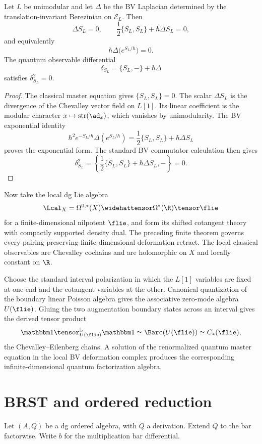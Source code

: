 \begin{theorem}
Let $L$ be unimodular and let $\Delta$ be the BV Laplacian determined by the translation-invariant Berezinian on $\mathcal E_L$. Then
\[
 \Delta S_L=0,
 \qquad
 \frac12\{S_L,S_L\}+\hbar\Delta S_L=0,
\]
and equivalently
\[
 \hbar\Delta\bigl(e^{S_L/\hbar}\bigr)=0.
\]
The quantum observable differential
\[
 \delta_{S_L}=\{S_L,-\}+\hbar\Delta
\]
satisfies $\delta_{S_L}^2=0$.
\end{theorem}
\begin{proof}
The classical master equation gives $\{S_L,S_L\}=0$. The scalar $\Delta S_L$ is the divergence of the Chevalley vector field on $L[1]$. Its linear coefficient is the modular character $x\mapsto\operatorname{str}(\ad_x)$, which vanishes by unimodularity. The BV exponential identity
\[
 \hbar^2e^{-S_L/\hbar}\Delta(e^{S_L/\hbar})
 =\frac12\{S_L,S_L\}+\hbar\Delta S_L
\]
proves the exponential form. The standard BV commutator calculation then gives
\[
 \delta_{S_L}^2=\left\{\frac12\{S_L,S_L\}+\hbar\Delta S_L,-\right\}=0.
\]
\end{proof}

Now take the local dg Lie algebra
\[
 \Lcal_X=\Omega^{0,*}(X)\widehattensor\Omega^*(\R)\tensor\flie
\]
for a finite-dimensional nilpotent $\flie$, and form its shifted cotangent theory with compactly supported density dual. The preceding finite theorem governs every pairing-preserving finite-dimensional deformation retract. The local classical observables are Chevalley cochains and are holomorphic on $X$ and locally constant on $\R$.

Choose the standard interval polarization in which the $L[1]$ variables are fixed at one end and the cotangent variables at the other. Canonical quantization of the boundary linear Poisson algebra gives the associative zero-mode algebra $U(\flie)$. Gluing the two augmentation boundary states across an interval gives the derived tensor product
\[
 \mathbbm1\tensor_{U(\flie)}^{\mathbb L}\mathbbm1
 \simeq\Barc(U(\flie))
 \simeq C_*(\flie),
\]
the Chevalley--Eilenberg chains. A solution of the renormalized quantum master equation in the local BV deformation complex produces the corresponding infinite-dimensional quantum factorization algebra.

\chapter{BRST and ordered reduction}
Let $(A,Q)$ be a dg ordered algebra, with $Q$ a derivation. Extend $Q$ to the bar factorwise. Write $b$ for the multiplication bar differential.

